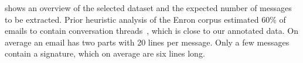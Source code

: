 \documentclass{llncs}
\begin{document}
%

 shows an overview of the selected dataset and the expected number of messages to be extracted.
Prior heuristic analysis of the Enron corpus estimated 60\% of emails to contain conversation threads~\cite{enron}, which is close to our annotated data.
On average an email has two parts with 20 lines per message.
Only a few messages contain a signature, which on average are six lines long.
\end{document}
